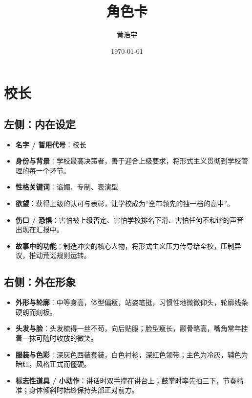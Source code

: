 \documentclass[11pt, a4paper]{article}
\title{角色卡}
\author{黄浩宇}
\date{\today}
\begin{document}
	
	\maketitle
	\newpage
	
	\tableofcontents
	\newpage
	
	\section{校长}
	
	\subsection*{左侧：内在设定}
	
	\begin{itemize}[leftmargin=2em, itemsep=0.2em]
		\item \textbf{名字 / 暂用代号}：校长
		\item \textbf{身份与背景}：学校最高决策者，善于迎合上级要求，将形式主义贯彻到学校管理的每一个环节。
		\item \textbf{性格关键词}：谄媚、专制、表演型
		\item \textbf{欲望}：获得上级的认可与表彰，让学校成为“全市领先的独一档的高中”。
		\item \textbf{伤口 / 恐惧}：害怕被上级否定、害怕学校排名下滑、害怕任何不和谐的声音出现在汇报中。
		\item \textbf{故事中的功能}：制造冲突的核心人物，将形式主义压力传导给全校，压制异议，推动荒诞规则运转。
	\end{itemize}
	
	\subsection*{右侧：外在形象}
	
	\begin{itemize}[leftmargin=2em, itemsep=0.2em]
		\item \textbf{外形与轮廓}：中等身高，体型偏瘦，站姿笔挺，习惯性地微微仰头，轮廓线条硬朗而刻板。
		\item \textbf{头发与脸}：头发梳得一丝不苟，向后贴服；脸型瘦长，颧骨略高，嘴角常年挂着一抹可随时收放的微笑。
		\item \textbf{服装与色彩}：深灰色西装套装，白色衬衫，深红色领带；主色为冷灰，辅色为暗红，风格正式而僵硬。
		\item \textbf{标志性道具 / 小动作}：讲话时双手撑在讲台上；鼓掌时率先拍三下，节奏精准；身体倾斜时始终保持头部正对前方。
	\end{itemize}
	
\end{document}
